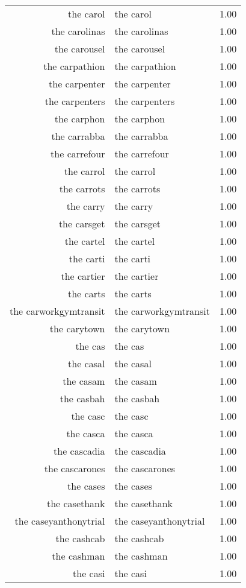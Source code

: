 \begin{table}[ht]
\begin{tabular}{rlr}
  the carol & the carol & 1.00 \\ 
  the carolinas & the carolinas & 1.00 \\ 
  the carousel & the carousel & 1.00 \\ 
  the carpathion & the carpathion & 1.00 \\ 
  the carpenter & the carpenter & 1.00 \\ 
  the carpenters & the carpenters & 1.00 \\ 
  the carphon & the carphon & 1.00 \\ 
  the carrabba & the carrabba & 1.00 \\ 
  the carrefour & the carrefour & 1.00 \\ 
  the carrol & the carrol & 1.00 \\ 
  the carrots & the carrots & 1.00 \\ 
  the carry & the carry & 1.00 \\ 
  the carsget & the carsget & 1.00 \\ 
  the cartel & the cartel & 1.00 \\ 
  the carti & the carti & 1.00 \\ 
  the cartier & the cartier & 1.00 \\ 
  the carts & the carts & 1.00 \\ 
  the carworkgymtransit & the carworkgymtransit & 1.00 \\ 
  the carytown & the carytown & 1.00 \\ 
  the cas & the cas & 1.00 \\ 
  the casal & the casal & 1.00 \\ 
  the casam & the casam & 1.00 \\ 
  the casbah & the casbah & 1.00 \\ 
  the casc & the casc & 1.00 \\ 
  the casca & the casca & 1.00 \\ 
  the cascadia & the cascadia & 1.00 \\ 
  the cascarones & the cascarones & 1.00 \\ 
  the cases & the cases & 1.00 \\ 
  the casethank & the casethank & 1.00 \\ 
  the caseyanthonytrial & the caseyanthonytrial & 1.00 \\ 
  the cashcab & the cashcab & 1.00 \\ 
  the cashman & the cashman & 1.00 \\ 
  the casi & the casi & 1.00 \\ 

\end{tabular}
\end{table}
